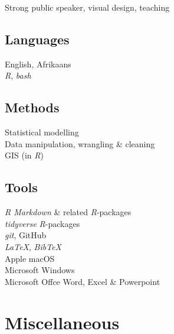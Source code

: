 \documentclass[10pt]{article}
\begin{document}
\begin{multicols}{2}

Strong public speaker, visual design, teaching

\subsection*{Languages}

English, Afrikaans \\
\textit{R}, \textit{bash}

\subsection*{Methods}

Statistical modelling \\
Data manipulation, wrangling \& cleaning \\
GIS (in \textit{R})

\columnbreak

\subsection*{Tools}

\textit{R Markdown} \& related \textit{R}-packages \\
\textit{tidyverse} \textit{R}-packages \\
\textit{git}, GitHub \\
\textit{LaTeX}, \textit{BibTeX} \\
Apple macOS \\
Microsoft Windows \\
Microsoft Offce Word, Excel \& Powerpoint

\end{multicols}

\clearpage %

\section*{Miscellaneous} %
\end{document}
